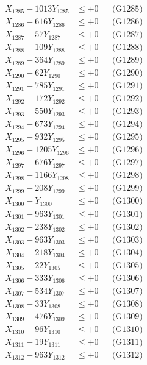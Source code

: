 \documentclass[a4paper,10pt]{article}
\begin{document}
{\begin{align}
X_{1285} - 1013Y_{1285} &\leq +0 && \text{(G1285)} \\
X_{1286} - 616Y_{1286} &\leq +0 && \text{(G1286)} \\
X_{1287} - 57Y_{1287} &\leq +0 && \text{(G1287)} \\
X_{1288} - 109Y_{1288} &\leq +0 && \text{(G1288)} \\
X_{1289} - 364Y_{1289} &\leq +0 && \text{(G1289)} \\
X_{1290} - 62Y_{1290} &\leq +0 && \text{(G1290)} \\
\allowbreak
X_{1291} - 785Y_{1291} &\leq +0 && \text{(G1291)} \\
X_{1292} - 172Y_{1292} &\leq +0 && \text{(G1292)} \\
X_{1293} - 550Y_{1293} &\leq +0 && \text{(G1293)} \\
X_{1294} - 673Y_{1294} &\leq +0 && \text{(G1294)} \\
X_{1295} - 932Y_{1295} &\leq +0 && \text{(G1295)} \\
X_{1296} - 1205Y_{1296} &\leq +0 && \text{(G1296)} \\
X_{1297} - 676Y_{1297} &\leq +0 && \text{(G1297)} \\
X_{1298} - 1166Y_{1298} &\leq +0 && \text{(G1298)} \\
X_{1299} - 208Y_{1299} &\leq +0 && \text{(G1299)} \\
X_{1300} - Y_{1300} &\leq +0 && \text{(G1300)} \\
\allowbreak
X_{1301} - 963Y_{1301} &\leq +0 && \text{(G1301)} \\
X_{1302} - 238Y_{1302} &\leq +0 && \text{(G1302)} \\
X_{1303} - 963Y_{1303} &\leq +0 && \text{(G1303)} \\
X_{1304} - 218Y_{1304} &\leq +0 && \text{(G1304)} \\
X_{1305} - 22Y_{1305} &\leq +0 && \text{(G1305)} \\
X_{1306} - 333Y_{1306} &\leq +0 && \text{(G1306)} \\
X_{1307} - 534Y_{1307} &\leq +0 && \text{(G1307)} \\
X_{1308} - 33Y_{1308} &\leq +0 && \text{(G1308)} \\
X_{1309} - 476Y_{1309} &\leq +0 && \text{(G1309)} \\
X_{1310} - 96Y_{1310} &\leq +0 && \text{(G1310)} \\
\allowbreak
X_{1311} - 19Y_{1311} &\leq +0 && \text{(G1311)} \\
X_{1312} - 963Y_{1312} &\leq +0 && \text{(G1312)} \\

\end{align}}
\end{document}
